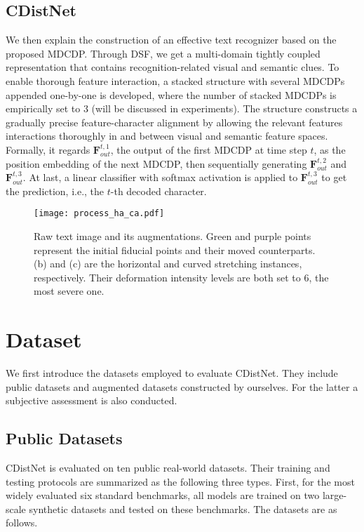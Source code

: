 \subsection{CDistNet}
We then explain the construction of an effective text recognizer based on the proposed MDCDP. Through DSF, we get a multi-domain tightly coupled representation that contains recognition-related visual and semantic clues. To enable thorough feature interaction, a stacked structure with several MDCDPs appended one-by-one is developed, where the number of stacked MDCDPs is empirically set to 3 (will be discussed in experiments). The structure constructs a gradually precise feature-character alignment by allowing the relevant features interactions thoroughly in and between visual and semantic feature spaces. Formally, it regards $\textbf{F}^{t,1}_{out}$, the output of the first MDCDP at time step $t$, as the position embedding of the next MDCDP, then sequentially generating $\textbf{F}^{t,2}_{out}$ and $\textbf{F}^{t,3}_{out}$. At last, a linear classifier with softmax activation is applied to $\textbf{F}^{t,3}_{out}$ to get the prediction, i.e., the $t$-th decoded character.

\begin{figure*}[t]
\centering
\texttt{[image: process\_ha\_ca.pdf]} \caption{Raw text image and its augmentations. Green and purple points represent the initial fiducial points and their moved counterparts. (b) and (c) are the horizontal and curved stretching instances, respectively. Their deformation intensity levels are both set to 6, the most severe one. }
\label{fig:HA&CA_process}
\end{figure*}


\section{Dataset}

We first introduce the datasets employed to evaluate CDistNet. They include public datasets and augmented datasets constructed by ourselves. For the latter a subjective assessment is also conducted.  


\subsection{Public Datasets}
CDistNet is evaluated on ten public real-world datasets. Their training and testing protocols are summarized as the following three types. First, for the most widely evaluated six standard benchmarks, all models are trained on two large-scale synthetic datasets and tested on these benchmarks. The datasets are as follows.

